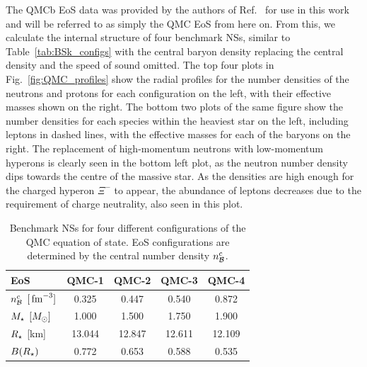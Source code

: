 The QMCb EoS data was provided by the authors of Ref.~\cite{Motta:2019tjc_Isovectoreffectsneutron} for use in this work and will be referred to as simply the QMC EoS from here on. From this, we calculate the internal structure of four benchmark NSs, similar to Table~\ref{tab:BSk_configs} with the central baryon density replacing the central density and the speed of sound omitted. The top four plots in Fig.~\ref{fig:QMC_profiles} show the radial profiles for the number densities of the neutrons and protons for each configuration on the left, with their effective masses shown on the right. The bottom two plots of the same figure show the number densities for each species within the heaviest star on the left, including leptons in dashed lines, with the effective masses for each of the baryons on the right. The replacement of high-momentum neutrons with low-momentum hyperons is clearly seen in the bottom left plot, as the neutron number density dips towards the centre of the massive star. As the densities are high enough for the charged hyperon $\Xi^-$ to appear, the abundance of leptons decreases due to the requirement of charge neutrality, also seen in this plot. 

\begin{table}[tb]
    \centering
    \begin{tabular}{l c c c c}
    \toprule
    \bf EoS & \bf QMC-1 & \bf QMC-2 & \bf QMC-3 & \bf QMC-4 \\ \midrule\midrule
    $n_{\cal B}^c$ $[{\rm \,fm}^{-3}]$ & 0.325 & 0.447 & 0.540 & 0.872\\
    $M_\star$ $[M_\odot]$ & 1.000 & 1.500 & 1.750 & 1.900  \\
    $R_\star$ [km] &  13.044 & 12.847 & 12.611 & 12.109 \\
    $B(R_\star)$ & 0.772 & 0.653 & 0.588 & 0.535\\
    \bottomrule
    \end{tabular} 
    \caption{Benchmark NSs for four different configurations of the QMC equation of state. 
    EoS configurations are determined by the central number density $n_{\cal B}^c$.
    }
    \label{tab:QMC_configs}
\end{table} 

